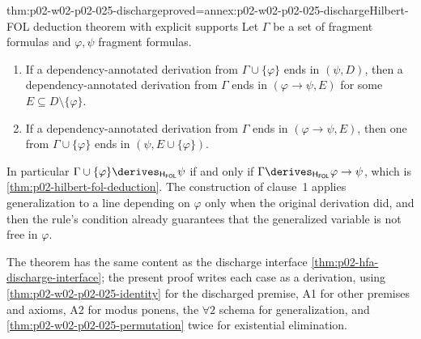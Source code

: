 \begin{hbtheorem}{thm:p02-w02-p02-025-discharge}{proved=annex:p02-w02-p02-025-discharge}{Hilbert-FOL deduction theorem with explicit supports}
Let \(\Gamma\) be a set of fragment formulas and \(\varphi,\psi\) fragment
formulas.
\begin{enumerate}
  \item If a dependency-annotated derivation from \(\Gamma\cup\{\varphi\}\)
        ends in \((\psi,D)\), then a dependency-annotated derivation from
        \(\Gamma\) ends in \((\varphi\to\psi,E)\) for some
        \(E\subseteq D\setminus\{\varphi\}\).
  \item If a dependency-annotated derivation from \(\Gamma\) ends in
        \((\varphi\to\psi,E)\), then one from \(\Gamma\cup\{\varphi\}\) ends
        in \((\psi,E\cup\{\varphi\})\).
\end{enumerate}
In particular
\(\Gamma\cup\{\varphi\}\derives_{\mathsf H_{\mathsf{FOL}}}\psi\) if and only if
\(\Gamma\derives_{\mathsf H_{\mathsf{FOL}}}\varphi\to\psi\), which is
\cref{thm:p02-hilbert-fol-deduction}.  The construction of clause~1 applies
generalization to a line depending on \(\varphi\) only when the original
derivation did, and then the rule's condition already guarantees that the
generalized variable is not free in \(\varphi\).
\end{hbtheorem}

The theorem has the same content as the discharge interface
\cref{thm:p02-hfa-discharge-interface}; the present proof writes each case as
a derivation, using \cref{thm:p02-w02-p02-025-identity} for the discharged
premise, A1 for other premises and axioms, A2 for modus ponens, the
\(\forall2\) schema for generalization, and
\cref{thm:p02-w02-p02-025-permutation} twice for existential elimination.

